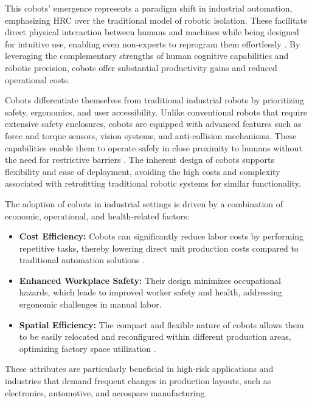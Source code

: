 This cobots' emergence represents a paradigm shift in industrial automation, emphasizing \ac{HRC} over the traditional model of robotic isolation. These facilitate direct physical interaction between humans and machines while being designed for intuitive use, enabling even non-experts to reprogram them effortlessly \cite{7140065}. By leveraging the complementary strengths of human cognitive capabilities and robotic precision, cobots offer substantial productivity gains and reduced operational costs.

Cobots differentiate themselves from traditional industrial robots by prioritizing safety, ergonomics, and user accessibility. Unlike conventional robots that require extensive safety enclosures, cobots are equipped with advanced features such as force and torque sensors, vision systems, and anti-collision mechanisms. These capabilities enable them to operate safely in close proximity to humans without the need for restrictive barriers \cite{cobots-design}. The inherent design of cobots supports flexibility and ease of deployment, avoiding the high costs and complexity associated with retrofitting traditional robotic systems for similar functionality.

The adoption of cobots in industrial settings is driven by a combination of economic, operational, and health-related factors:
\begin{itemize}
    \item \textbf{Cost Efficiency:} Cobots can significantly reduce labor costs by performing repetitive tasks, thereby lowering direct unit production costs compared to traditional automation solutions \cite{cobot-2019collaborative}.
    \item \textbf{Enhanced Workplace Safety:} Their design minimizes occupational hazards, which leads to improved worker safety and health, addressing ergonomic challenges in manual labor.
    \item \textbf{Spatial Efficiency:} The compact and flexible nature of cobots allows them to be easily relocated and reconfigured within different production areas, optimizing factory space utilization \cite{cobots-implementation}.
\end{itemize}


These attributes are particularly beneficial in high-risk applications and industries that demand frequent changes in production layouts, such as electronics, automotive, and aerospace manufacturing.


